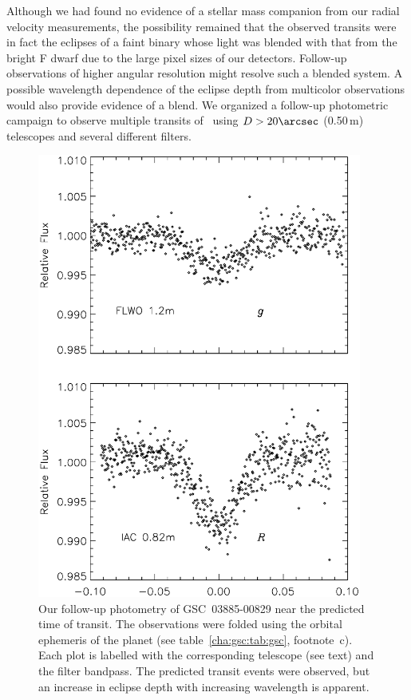 Although we had found no evidence of a stellar mass companion from our
radial velocity measurements, the possibility remained that the
observed transits were in fact the eclipses of a faint binary whose
light was blended with that from the bright F dwarf due to the large
pixel sizes of our detectors. Follow-up observations of higher
angular resolution might resolve such a blended system. A possible
wavelength dependence of the eclipse depth from multicolor
observations would also provide evidence of a blend. We organized a
follow-up photometric campaign to observe multiple transits of \gscOTE\
using $D>20\arcsec$ (0.50\,m) telescopes and several different filters.

\begin{figure}
\begin{center}
\includegraphics[width=0.95\textwidth]{3_f4}
\caption[Color dependence of recovered transits of \mbox{GSC 03885-00829}]{Our follow-up photometry of \mbox{GSC 03885-00829} near
  the predicted time of transit. The observations were folded using
  the orbital ephemeris of the planet (see table~\ref{cha:gsc:tab:gsc}, footnote~c). Each
  plot is labelled with the corresponding telescope (see text) and
  the filter bandpass. The predicted transit events were observed, but
  an increase in eclipse depth with increasing wavelength is
  apparent.}\label{cha:gsc:fig:multicolor}
\end{center}
\end{figure}

